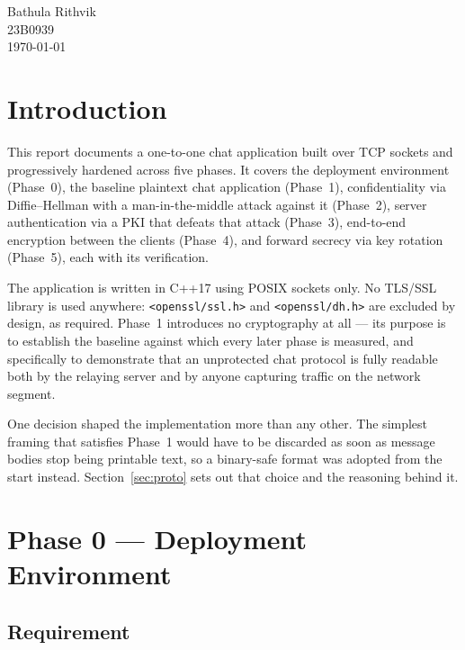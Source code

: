 \documentclass[11pt,a4paper]{article}
\begin{document}
\begin{titlepage}
\vfill

{\sffamily\large Bathula Rithvik}\\[3pt]
{\sffamily 23B0939}\\[10pt]
{\sffamily\small \today}

\vspace{1.5cm}
\end{titlepage}

\newpage
\tableofcontents
\newpage

\section{Introduction}

This report documents a one-to-one chat application built over TCP sockets and progressively hardened
across five phases. It covers the deployment environment (Phase~0), the
baseline plaintext chat application (Phase~1), confidentiality via Diffie--Hellman with a
man-in-the-middle attack against it (Phase~2), server authentication via a PKI that defeats that
attack (Phase~3), end-to-end encryption between the clients (Phase~4), and forward secrecy via key rotation
(Phase~5), each with its verification.

The application is written in C++17 using POSIX sockets only. No TLS/SSL library is used anywhere:
\texttt{<openssl/ssl.h>} and \texttt{<openssl/dh.h>} are excluded by design, as required. Phase~1
introduces no cryptography at all --- its purpose is to establish the baseline against which every
later phase is measured, and specifically to demonstrate that an unprotected chat protocol is fully
readable both by the relaying server and by anyone capturing traffic on the network segment.

One decision shaped the implementation more than any other. The simplest framing that satisfies
Phase~1 would have to be discarded as soon as message bodies stop being printable text, so a
binary-safe format was adopted from the start instead. Section~\ref{sec:proto} sets out that choice
and the reasoning behind it.

\section{Phase 0 --- Deployment Environment}

\subsection{Requirement}
\end{document}
